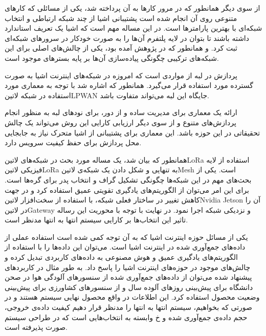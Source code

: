 از سوی دیگر همانطور که در مرور کارها به آن پرداخته شد، یکی از مسائلی که کارهای متنوعی روی آن انجام شده است پشتیبانی اشیا از چند شبکه ارتباطی و انتخاب شبکه‌ای با بهترین
پارامترها است. در این مساله مهم است که اشیا یک تعریف استاندارد داشته باشند تا بتوان در لایه پلتفرم آن‌ها را به صورت خودکار در سرورهای شبکه‌ای ثبت کرد.
و همانطور که در پژوهش  آمده بود، یکی از چالش‌های اصلی برای این شبکه‌های ترکیبی چگونگی پیاده‌سازی آن‌ها بر پایه بسترهای موجود است.


پردازش در لبه از مواردی است که امروزه در شبکه‌های اینترنت اشیا به صورت گسترده مورد استفاده قرار می‌گیرد.
همانطور که اشاره شد با توجه به معماری مورد استفاده در شبکه ‌لاتین{LPWAN} جایگاه این لبه می‌تواند متفاوت باشد.

ارائه یک معماری برای مدیریت ساده و از دور، برای نودهای لبه به منظور انجام پردازش‌های متنوع و از سوی دیگر ارزیابی کارایی این روش می‌تواند یک چالش تحقیقاتی در این حوزه باشد.
این معماری برای پشتیبانی از اشیا متحرک نیاز به جابجایی محل پردازش برای حفظ کیفیت سرویس دارد.


همانطور که بیان شد، یک مساله مورد بحث در شبکه‌های ‌لاتین{LoRa} استفاده از لایه فیزیکی ‌لاتین{LoRa} به تنهایی و شکل دادن یک شبکه‌ی ‌لاتین{Mesh} است.
یکی از بحث‌های مهم در این شبکه‌ها چگونگی تشکیل گراف و انتخاب پدر برای گره‌ها است. برای این امر می‌توان از الگوریتم‌های یادگیری تقویتی عمیق استفاده کرد
و در جهت کاهش تغییر در ساختار فعلی شبکه، با استفاده از سخت‌افزار ‌لاتین{Nvidia Jetson} آن را در ‌لاتین{Gateway} و نزدیکی شبکه اجرا نمود.
در نهایت با توجه با محوریت این رساله تاثیر این انتخاب‌ها بر کارایی سیستم انتها به انتها مدنظر است.


یکی از مسائل حوزه اینترنت اشیا که به آن توجه کمی شده است استفاده عملی از داده‌های جمع‌آوری شده در اینترنت اشیا است. می‌توان این داده‌ها را با استفاده از الگوریتم‌های یادگیری عمیق و هوش مصنوعی به داده‌های کاربردی تبدیل کرده
و چالش‌های موجود در حوزه‌های اینترنت اشیا را پاسخ داد. به طور مثال در کاربردهای پیشنهاد شده می‌توان از داده‌های جمع‌آوری شده از سنسورهای آلودگی هوا در صحن دانشگاه برای پیش‌بینی روزهای آلوده سال و از سنسورهای کشاورزی
برای پیش‌بینی وضعیت محصول استفاده کرد.
این اطلاعات در واقع محصول نهایی سیستم هستند و در صورتی که بخواهیم، سیستم انتها به انتها را مدنظر قرار دهیم کیفیت داده‌ی خروجی، حجم داده‌ی جمع‌آوری شده و ‌خ وابسته به انتخاب‌هایی است که در طراحی سیستم صورت پذیرفته است.

